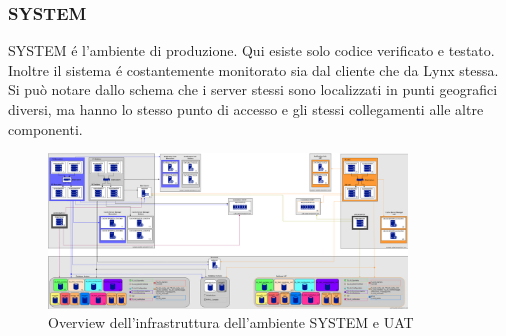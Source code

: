 \subsubsection{SYSTEM}

SYSTEM é l'ambiente di produzione. Qui esiste solo codice verificato e testato. Inoltre il sistema é costantemente monitorato sia dal cliente che da Lynx stessa.  \\
Si può notare dallo schema che i server stessi sono localizzati in punti geografici diversi, ma hanno lo stesso punto di accesso e gli stessi collegamenti alle altre componenti.  

\begin{figure}[!ht]
    \centering
	\includegraphics[width=0.85\textwidth]{./res/img/SchemiAmbienti_SYSTEM-UAT_v1.1.png}
    \caption{Overview dell'infrastruttura dell'ambiente SYSTEM e UAT}
\end{figure}


